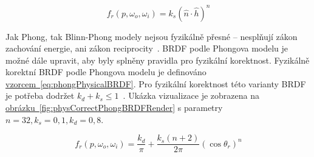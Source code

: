 \documentclass[czech,master]{diploma}
\newcommand{\uvec}[1]{\hat{#1}}
\newcommand{\point}{p}
\newcommand{\brdf}{f_r\left(\point,\omega_{o},\omega_{i}\right)}
\newcommand{\normVec}{\uvec{n}}
\newcommand{\halfVec}{\uvec{h}}
\begin{document}
\begin{equation} \label{eq:blinnBRDF}
  \brdf = k_s{(\normVec\cdot\halfVec)}^{n}
\end{equation}

Jak Phong, tak Blinn-Phong modely nejsou fyzikálně přesné -- nesplňují zákon zachování energie, ani zákon reciprocity~\cite{BRDFOverview}. BRDF podle Phongova modelu je možné dále upravit, aby byly splněny pravidla pro fyzikální korektnost. Fyzikálně korektní BRDF podle Phongova modelu je definováno \hyperref[eq:phongPhysicalBRDF]{vzorcem~\ref{eq:phongPhysicalBRDF}}. Pro fyzikální korektnost této varianty BRDF je potřeba dodržet \(k_d + k_s \leq 1\)~\cite{LaFortunePhongBRDF}. Ukázka vizualizace je zobrazena na \hyperref[fig:physCorrectPhongBRDFRender]{obrázku~\ref{fig:physCorrectPhongBRDFRender}} s parametry \(n = 32, k_s = 0{,}1, k_d = 0{,}8\).

\begin{equation} \label{eq:phongPhysicalBRDF}
  \brdf = \frac{k_d}{\pi} +
  \frac{k_s\left(n+2\right)}{2\pi}{\left(\cos\theta_r\right)}^{n}
\end{equation}
\end{document}
